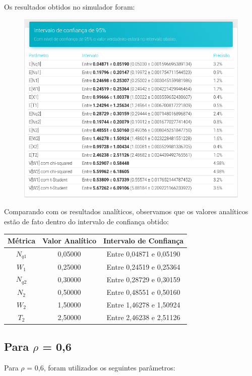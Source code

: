 \documentclass[a4paper,12pt]{report}
\begin{document}
Os resultados obtidos no simulador foram:
\begin{figure}[H]
\includegraphics[width=1\textwidth]{./graficos/cap4/rho04.png}
\vspace{-10mm}
\end{figure}

Comparando com os resultados analíticos, observamos que os valores analíticos estão de fato dentro do intervalo de confiança obtido:

\vspace{-5mm}
\begin{center}
\begin{tabular}{ c c c }
  \hline
  \textbf{Métrica} & \textbf{Valor Analítico} & \textbf{Intervalo de Confiança} \\
  \hline
  $N_{q1}$ & 0,05000 & Entre 0,04871 e 0,05190 \\
  $W_1$    & 0,25000 & Entre 0,24519 e 0,25364 \\
  $N_{q2}$ & 0,30000 & Entre 0,28729 e 0,30159 \\
  $N_2$    & 0,50000 & Entre 0,48551 e 0,50160 \\
  $W_2$    & 1,50000 & Entre 1,46278 e 1,50924 \\
  $T_2$    & 2,50000 & Entre 2,46238 e 2,51126 \\
  \hline
\end{tabular}
\end{center}

\subsection{Para $\rho$ = 0,6}
Para $\rho$ = 0,6, foram utilizados os seguintes parâmetros:
\end{document}
